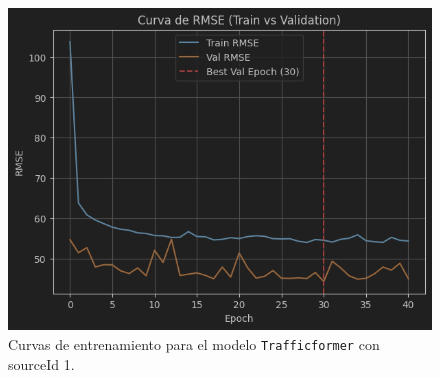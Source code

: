 \begin{figure}[H]
\begin{minipage}{0.48\textwidth}
		\vspace{0.2cm}
		\includegraphics[width=\linewidth]{includes/cap5/graphs/sid1_trafficformer_rmse.png}
	\end{minipage}
	\caption{Curvas de entrenamiento para el modelo \texttt{Trafficformer} con sourceId 1.}
	\label{fig:curvas_sid1_trafficformer}
\end{figure}


